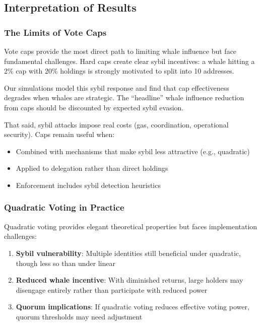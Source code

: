 
\subsection{Interpretation of Results}

\subsubsection{The Limits of Vote Caps}

Vote caps provide the most direct path to limiting whale influence but face fundamental challenges. Hard caps create clear sybil incentives: a whale hitting a 2\% cap with 20\% holdings is strongly motivated to split into 10 addresses.

Our simulations model this sybil response and find that cap effectiveness degrades when whales are strategic. The ``headline'' whale influence reduction from caps should be discounted by expected sybil evasion.

That said, sybil attacks impose real costs (gas, coordination, operational security). Caps remain useful when:
\begin{itemize}
    \item Combined with mechanisms that make sybil less attractive (e.g., quadratic)
    \item Applied to delegation rather than direct holdings
    \item Enforcement includes sybil detection heuristics
\end{itemize}

\subsubsection{Quadratic Voting in Practice}

Quadratic voting provides elegant theoretical properties but faces implementation challenges:

\begin{enumerate}
    \item \textbf{Sybil vulnerability}: Multiple identities still beneficial under quadratic, though less so than under linear
    \item \textbf{Reduced whale incentive}: With diminished returns, large holders may disengage entirely rather than participate with reduced power
    \item \textbf{Quorum implications}: If quadratic voting reduces effective voting power, quorum thresholds may need adjustment
\end{enumerate}

